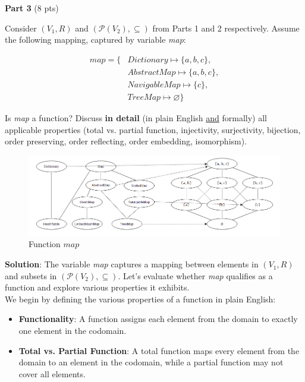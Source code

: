 \documentclass[12pt]{article}
\begin{document}
\begin{spacing}{1.5}
	\noindent \textbf{Part 3} (8 pts)
			
	\noindent Consider $(V_1, R)$ and $(\mathcal{P}(V_2), \subseteq)$ from Parts 1 and 2 respectively. Assume the following mapping, captured by variable \textit{map}:
			
	\begin{align*}
		map = \{ & Dictionary \mapsto \{a,b,c\},  \\
		         & AbstractMap \mapsto \{a,b,c\}, \\
		         & NavigableMap \mapsto \{c\},    \\
		         & TreeMap \mapsto \varnothing\}  
	\end{align*}
			
	\noindent Is \textit{map} a function? Discuss \textbf{in detail} (in plain English \uline{and} formally) all applicable properties (total vs. partial function, injectivity, surjectivity, bijection, order preserving, order reflecting, order embedding, isomorphism).\\
		
	\begin{figure}[htp]
		\centering
		\includegraphics[width=1.1\textwidth]{FunctionMapping_6_3.png}
		\caption{Function $map$}
		\label{fig:figure}
	\end{figure}
		
	\noindent \textbf{Solution}: The variable \textit{map} captures a mapping between elements in $(V_1, R)$ and subsets in $(\mathcal{P}(V_2), \subseteq)$. Let's evaluate whether \textit{map} qualifies as a function and explore various properties it exhibits.\\
		
	\noindent We begin by defining the various properties of a function in plain English:
		
	\begin{itemize}
		\item \textbf{Functionality}: A function assigns each element from the domain to exactly one element in the codomain.
		      		              
		\item \textbf{Total vs. Partial Function}: A total function maps every element from the domain to an element in the codomain, while a partial function may not cover all elements.
		      		          

\end{itemize}
\end{spacing}
\end{document}
